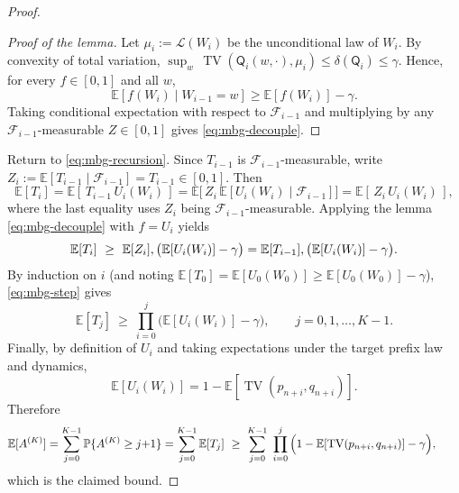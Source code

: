 \begin{proof}
\begin{proof}[Proof of the lemma]
Let $\mu_i:=\mathcal L(W_i)$ be the unconditional law of $W_i$. By convexity of total variation, $\sup_w \,\operatorname{TV}(\mathsf Q_i(w,\cdot),\mu_i)\le\delta(\mathsf Q_i)\le\gamma$. Hence, for every $f\in[0,1]$ and all $w$,
\[
\mathbb{E}[f(W_i)\mid W_{i-1}=w]\ge \mathbb{E}[f(W_i)]-\gamma.
\]
Taking conditional expectation with respect to $\mathcal F_{i-1}$ and multiplying by any $\mathcal F_{i-1}$-measurable $Z\in[0,1]$ gives \eqref{eq:mbg-decouple}.\qedhere
\end{proof}

Return to \eqref{eq:mbg-recursion}. Since $T_{i-1}$ is $\mathcal F_{i-1}$-measurable, write $Z_i:=\mathbb{E}[T_{i-1}\mid\mathcal F_{i-1}]=T_{i-1}\in[0,1]$. Then
\[
\mathbb{E}[T_i]
=\mathbb{E}[\,T_{i-1}\,U_i(W_i)\,]
=\mathbb{E}\big[\,Z_i\,\mathbb{E}[U_i(W_i)\mid\mathcal F_{i-1}]\big]
=\mathbb{E}[\,Z_i\,U_i(W_i)\,],
\]
where the last equality uses $Z_i$ being $\mathcal F_{i-1}$-measurable. Applying the lemma \eqref{eq:mbg-decouple} with $f=U_i$ yields
\begin{equation}\label{eq:mbg-step}
\mathbb{E}[T_i]\ \ge\ \mathbb{E}[Z_i]\\,\big(\mathbb{E}[U_i(W_i)]-\gamma\big)
=\mathbb{E}[T_{i-1}]\\,\big(\mathbb{E}[U_i(W_i)]-\gamma\big).
\end{equation}
By induction on $i$ (and noting $\mathbb{E}[T_0]=\mathbb{E}[U_0(W_0)]\ge \mathbb{E}[U_0(W_0)]-\gamma$), \eqref{eq:mbg-step} gives
\[
\mathbb{E}[T_j]\ \ge\ \prod_{i=0}^{j}\big(\mathbb{E}[U_i(W_i)]-\gamma\big),\qquad j=0,1,\dots,K-1.
\]
Finally, by definition of $U_i$ and taking expectations under the target prefix law and dynamics,
\[
\mathbb{E}[U_i(W_i)]
=1-\mathbb{E}[\operatorname{TV}(p_{n+i},q_{n+i})].
\]
Therefore
\[
\mathbb{E}[A^{(K)}]
=\sum_{j=0}^{K-1}\mathbb{P}\{A^{(K)}\ge j{+}1\}
=\sum_{j=0}^{K-1}\mathbb{E}[T_j]
\ \ge\ \sum_{j=0}^{K-1}\ \prod_{i=0}^{j}\Big(1-\mathbb{E}[\operatorname{TV}(p_{n+i},q_{n+i})]-\gamma\Big),\qquad \qedhere
\]
which is the claimed bound.
\end{proof}
